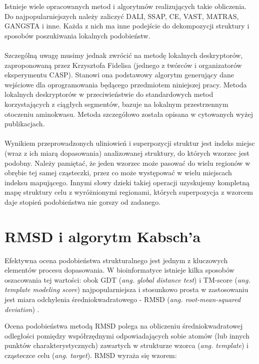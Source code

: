 \documentclass[licencjacka]{pracamgr}
\begin{document}
Istnieje wiele opracowanych metod i algorytmów realizujących takie obliczenia. Do najpopularniejszych należy zaliczyć DALI\cite{holmSander1993}, SSAP\cite{orengoTaylor1996}, CE\cite{shindyalovBourne1998}, VAST\cite{madejGibratBryant1995}, MATRAS\cite{kawabataNishikawa2000}, GANGSTA\cite{guerlerKnapp2008} i inne. Każda z nich ma inne podejście do dekompozycji struktury i sposobów poszukiwania lokalnych podobieństw. 
\\
\\
Szczególną uwagę musimy jednak zwrócić na metodę lokalnych deskryptorów, zaproponowaną przez Krzysztofa Fidelisa \cite{daniluk11}\cite{fidelis2003} (jednego z twórców i organizatorów eksperymentu CASP). Stanowi ona podstawowy algorytm generujący dane wejściowe dla oprogramowania będącego przedmiotem niniejszej pracy. Metoda lokalnych deskryptorów w przeciwieństwie do standardowych metod korzystających z ciągłych segmentów, bazuje na lokalnym przestrzennym otoczeniu aminokwasu. Metoda szczegółowo została opisana w cytowanych wyżej publikacjach.
\\
\\
Wynikiem przeprowadzonych uliniowień i superpozycji struktur jest indeks miejsc (wraz z ich miarą dopasowania) analizowanej struktury, do których wzorzec jest podobny. Należy pamiętać, że jeden wzorzec może pasować do wielu regionów w obrębie tej samej cząsteczki, przez co może występować w wielu miejscach indeksu mapującego. Innymi słowy dzieki takiej operacji uzyskujemy kompletną mapę struktury celu z wyróżnionymi regionami, których superpozycja z wzorcem daje stopień podobieństwa nie gorszy od zadanego.

\section{RMSD i algorytm Kabsch'a}

Efektywna ocena podobieństwa strukturalnego jest jednym z kluczowych elementów procesu dopasowania. W bioinformatyce istnieje kilka sposobów oszacowania tej wartości: obok GDT (\textit{ang. global distance test}) i TM-score (\textit{ang. template modeling score}) \cite{zhangSkolnick2005} najpopularniejsza i stosunkowo prosta w zastosowaniu jest miara odchylenia średniokwadratowego - RMSD (\textit{ang. root-mean-squared deviation}) \cite{kufarevaAbagyan2012}. 

Ocena podobieństwa metodą RMSD polega na obliczeniu średniokwadratowej odległości pomiędzy współrzędnymi odpowiadających sobie atomów (lub innych punktów charakterystycznych) zawartych w strukturze wzorca (\textit{ang. template}) i cząsteczce celu (\textit{ang. target}). RMSD wyraża się wzorem:
\end{document}
